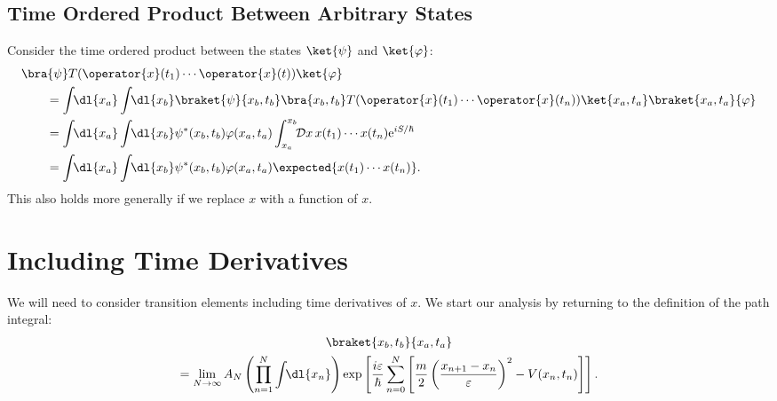 \documentclass[fleqn]{NotesClass}
\newcommand*{\e}{\mathrm{e}}
\newcommand*{\timeorder}{T}
\begin{document}
    \subsection{Time Ordered Product Between Arbitrary States}
    Consider the time ordered product between the states \(\ket{\psi}\) and \(\ket{\varphi}\):
    \begin{align}
        &\bra{\psi} \timeorder (\operator{x}(t_1) \dotsm \operator{x}(t)) \ket{\varphi}\\
        &\qquad= \int \!\! \dl{x_a} \int \!\! \dl{x_b} \braket{\psi}{x_b, t_b}\bra{x_b, t_b} \timeorder (\operator{x}(t_1) \dotsm \operator{x}(t_n)) \ket{x_a, t_a} \braket{x_a, t_a}{\varphi}\notag\\
        &\qquad= \int \!\! \dl{x_a} \int \!\! \dl{x_b} \psi^*(x_b, t_b) \varphi(x_a, t_a) \int_{x_a}^{x_b} \!\! \DL{x} \, x(t_1) \dotsm x(t_n) \e^{iS/\hbar}\\
        &\qquad= \int \!\! \dl{x_a} \int \!\! \dl{x_b} \psi^*(x_b, t_b) \varphi(x_a, t_a) \expected{x(t_1) \dotsm x(t_n)}.
    \end{align}
    This also holds more generally if we replace \(x\) with a function of \(x\).
    
    \section{Including Time Derivatives}
    We will need to consider transition elements including time derivatives of \(x\).
    We start our analysis by returning to the definition of the path integral:
    \begin{multline}\label{eqn:definition of path integral}
        \braket{x_b, t_b}{x_a, t_a}\\
        = \lim_{N\to\infty} A_N \left( \prod_{n=1}^{N} \int\!\!\dl{x_n} \right) \exp\left[ \frac{i\varepsilon}{\hbar} \sum_{n=0}^{N} \left[ \frac{m}{2}\left( \frac{x_{n+1} - x_n}{\varepsilon} \right)^2 - V(x_n, t_n) \right] \right].
    \end{multline}
\end{document}
